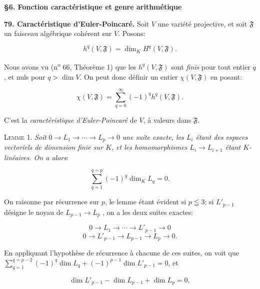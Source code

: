 \begin{center}
\textbf{\S6. Fonction caractéristique et genre arithmétique}
\end{center}

\textbf{79. Caractéristique d'Euler-Poincaré.} Soit $V$ une variété projective, et soit $\mathfrak{F}$ un faisceau algébrique cohérent sur $V$. Posons:

\begin{equation*}
h^q(V, \mathfrak{F}) = \dim_K H^q(V, \mathfrak{F}).
\end{equation*}

Nous avons vu (n\textsuperscript{o} 66, Théorème 1) que les $h^q(V, \mathfrak{F})$ sont \textit{finis} pour tout entier $q$, et nuls pour $q > \dim V$. On peut donc définir un entier $\chi(V, \mathfrak{F})$ en posant:

\begin{equation*}
\chi(V, \mathfrak{F}) = \sum_{q=0}^{\infty} (-1)^q h^q(V, \mathfrak{F}).
\end{equation*}

C'est la \textit{caractéristique d'Euler-Poincaré} de $V$, à valeurs dans $\mathfrak{F}$.

\textsc{Lemme} 1. \textit{Soit} $0 \rightarrow L_1 \rightarrow \cdots \rightarrow L_p \rightarrow 0$ \textit{une suite exacte, les $L_i$ étant des espaces vectoriels de dimension finie sur $K$, et les homomorphismes $L_i \rightarrow L_{i+1}$ étant $K$-linéaires. On a alors}:

\begin{equation*}
\sum_{q=1}^{q=p} (-1)^q \dim_K L_q = 0.
\end{equation*}

On raisonne par récurrence sur $p$, le lemme étant évident si $p \leqq 3$; si $L'_{p-1}$ désigne le noyau de $L_{p-1} \rightarrow L_p$ , on a les deux suites exactes:

\begin{equation*}
0 \rightarrow L_1 \rightarrow \cdots \rightarrow L'_{p-1} \rightarrow 0
\end{equation*}
\begin{equation*}
0 \rightarrow L'_{p-1} \rightarrow L_{p-1} \rightarrow L_p \rightarrow 0.
\end{equation*}

En appliquant l'hypothèse de récurrence à chacune de ces suites, on voit que $\sum_{q=1}^{q=p-2} (-1)^q \dim L_q + (-1)^{p-1} \dim L'_{p-1} = 0$, et

\begin{equation*}
\dim L'_{p-1} - \dim L_{p-1} + \dim L_p = 0,
\end{equation*}

